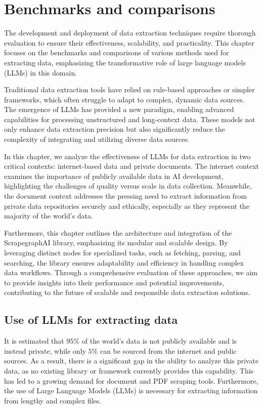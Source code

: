 \chapter{Benchmarks and comparisons}

The development and deployment of data extraction techniques require thorough evaluation to ensure their effectiveness, scalability, and practicality. This chapter focuses on the benchmarks and comparisons of various methods used for extracting data, emphasizing the transformative role of large language models (LLMs) in this domain.

Traditional data extraction tools have relied on rule-based approaches or simpler frameworks, which often struggle to adapt to complex, dynamic data sources. The emergence of LLMs has provided a new paradigm, enabling advanced capabilities for processing unstructured and long-context data. These models not only enhance data extraction precision but also significantly reduce the complexity of integrating and utilizing diverse data sources.

In this chapter, we analyze the effectiveness of LLMs for data extraction in two critical contexts: internet-based data and private documents. The internet context examines the importance of publicly available data in AI development, highlighting the challenges of quality versus scale in data collection. Meanwhile, the document context addresses the pressing need to extract information from private data repositories securely and ethically, especially as they represent the majority of the world's data.

Furthermore, this chapter outlines the architecture and integration of the ScrapegraphAI library, emphasizing its modular and scalable design. By leveraging distinct nodes for specialized tasks, such as fetching, parsing, and searching, the library ensures adaptability and efficiency in handling complex data workflows. Through a comprehensive evaluation of these approaches, we aim to provide insights into their performance and potential improvements, contributing to the future of scalable and responsible data extraction solutions.
\section{Use of LLMs for extracting data}
It is estimated that $95\%$ of the world's data is not publicly available and is instead private, while only $5\%$ can be sourced from the internet and public sources. As a result, there is a significant gap in the ability to analyze this private data, as no existing library or framework currently provides this capability. This has led to a growing demand for document and PDF scraping tools. Furthermore, the use of Large Language Models (LLMs) is necessary for extracting information from lengthy and complex files.


